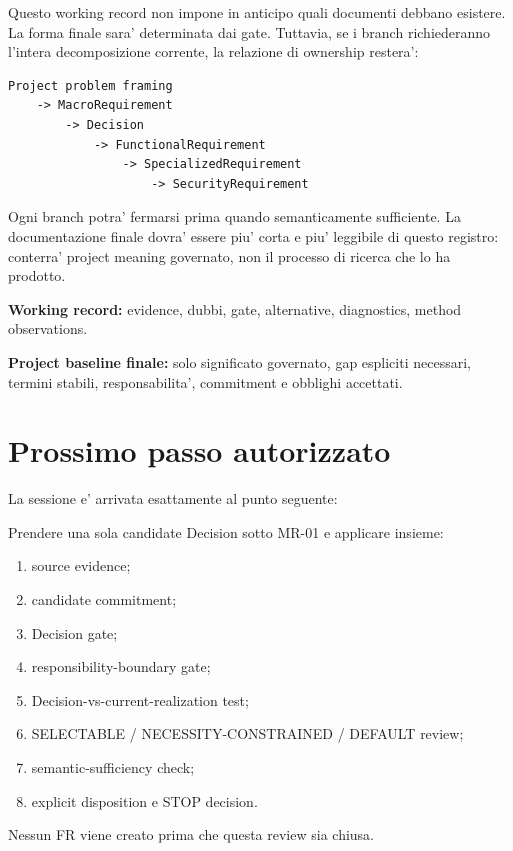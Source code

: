 \documentclass[11pt,a4paper]{article}
\begin{document}
Questo working record non impone in anticipo quali documenti debbano esistere. La forma finale sara' determinata dai gate. Tuttavia, se i branch richiederanno l'intera decomposizione corrente, la relazione di ownership restera':

\begin{lstlisting}
Project problem framing
    -> MacroRequirement
        -> Decision
            -> FunctionalRequirement
                -> SpecializedRequirement
                    -> SecurityRequirement
\end{lstlisting}

Ogni branch potra' fermarsi prima quando semanticamente sufficiente. La documentazione finale dovra' essere piu' corta e piu' leggibile di questo registro: conterra' project meaning governato, non il processo di ricerca che lo ha prodotto.

\begin{ddtaprinciple}[title={Working record vs project baseline}]
\textbf{Working record:} evidence, dubbi, gate, alternative, diagnostics, method observations.\par
\textbf{Project baseline finale:} solo significato governato, gap espliciti necessari, termini stabili, responsabilita', commitment e obblighi accettati.
\end{ddtaprinciple}

\section{Prossimo passo autorizzato}

La sessione e' arrivata esattamente al punto seguente:

\begin{ddtaworking}[title={NEXT - first Decision under MR-01}]
Prendere una sola candidate Decision sotto MR-01 e applicare insieme:
\begin{enumerate}
  \item source evidence;
  \item candidate commitment;
  \item Decision gate;
  \item responsibility-boundary gate;
  \item Decision-vs-current-realization test;
  \item SELECTABLE / NECESSITY-CONSTRAINED / DEFAULT review;
  \item semantic-sufficiency check;
  \item explicit disposition e STOP decision.
\end{enumerate}
Nessun FR viene creato prima che questa review sia chiusa.
\end{ddtaworking}
\end{document}
